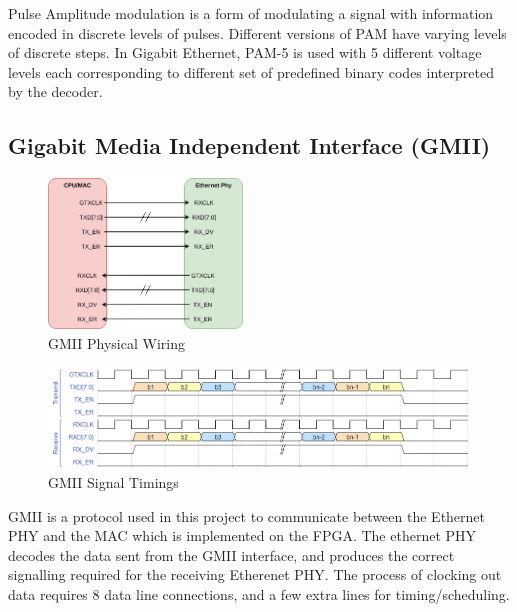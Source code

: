 \par Pulse Amplitude modulation is a form of modulating a signal with information encoded in discrete levels of pulses.
Different versions of PAM have varying levels of discrete steps. In Gigabit Ethernet, PAM-5 is used with 5 
different voltage levels each corresponding to different set of predefined binary codes interpreted by the 
decoder.

\subsection{Gigabit Media Independent Interface (GMII)}

\begin{figure}[H]
    \begin{center}
        \includegraphics[keepaspectratio,height=4cm]{Images/GMIIWiring}
        \caption{GMII Physical Wiring}
        \label{fig:gmiiwiring}
    \end{center}
\end{figure}

\begin{figure}[H]
    \begin{center}
        \includegraphics[keepaspectratio,width=15cm]{Images/GMIISignaling}
        \caption{GMII Signal Timings}
        \label{fig:gmiisignals}
    \end{center}
\end{figure}

\par GMII is a protocol used in this project to communicate between the Ethernet PHY and the MAC which is implemented 
on the FPGA. The ethernet PHY decodes the data sent from the GMII interface, and produces the correct signalling 
required for the receiving Etherenet PHY. The process of clocking out data requires 8 data line connections, 
and a few extra lines for timing/scheduling.

